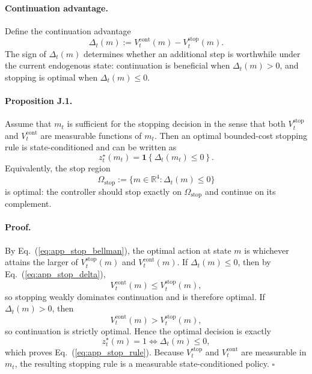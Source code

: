 \paragraph{Continuation advantage.}
Define the continuation advantage
\begin{equation}
\Delta_t(m)
:=
V_t^{\mathrm{cont}}(m)-V_t^{\mathrm{stop}}(m).
\label{eq:app_stop_delta}
\end{equation}
The sign of \(\Delta_t(m)\) determines whether an additional step is worthwhile under the current endogenous state:
continuation is beneficial when \(\Delta_t(m)>0\), and stopping is optimal when \(\Delta_t(m)\le 0\).

\paragraph{Proposition J.1.}
Assume that \(m_t\) is sufficient for the stopping decision in the sense that both \(V_t^{\mathrm{stop}}\) and \(V_t^{\mathrm{cont}}\) are measurable functions of \(m_t\).
Then an optimal bounded-cost stopping rule is state-conditioned and can be written as
\begin{equation}
z_t^{\star}(m_t)
=
\mathbf{1}\!\left\{\Delta_t(m_t)\le 0\right\}.
\label{eq:app_stop_rule}
\end{equation}
Equivalently, the stop region
\begin{equation}
\Omega_{\mathrm{stop}}
:=
\{m\in\mathbb{R}^{4}:\Delta_t(m)\le 0\}
\label{eq:app_stop_region}
\end{equation}
is optimal: the controller should stop exactly on \(\Omega_{\mathrm{stop}}\) and continue on its complement.

\paragraph{Proof.}
By Eq.~(\ref{eq:app_stop_bellman}), the optimal action at state \(m\) is whichever attains the larger of \(V_t^{\mathrm{stop}}(m)\) and \(V_t^{\mathrm{cont}}(m)\).
If \(\Delta_t(m)\le 0\), then by Eq.~(\ref{eq:app_stop_delta}),
\begin{equation}
V_t^{\mathrm{cont}}(m)\le V_t^{\mathrm{stop}}(m),
\end{equation}
so stopping weakly dominates continuation and is therefore optimal.
If \(\Delta_t(m)>0\), then
\begin{equation}
V_t^{\mathrm{cont}}(m)>V_t^{\mathrm{stop}}(m),
\end{equation}
so continuation is strictly optimal.
Hence the optimal decision is exactly
\begin{equation}
z_t^{\star}(m)=1 \iff \Delta_t(m)\le 0,
\end{equation}
which proves Eq.~(\ref{eq:app_stop_rule}).
Because \(V_t^{\mathrm{stop}}\) and \(V_t^{\mathrm{cont}}\) are measurable in \(m_t\), the resulting stopping rule is a measurable state-conditioned policy.
\hfill\(\square\)

